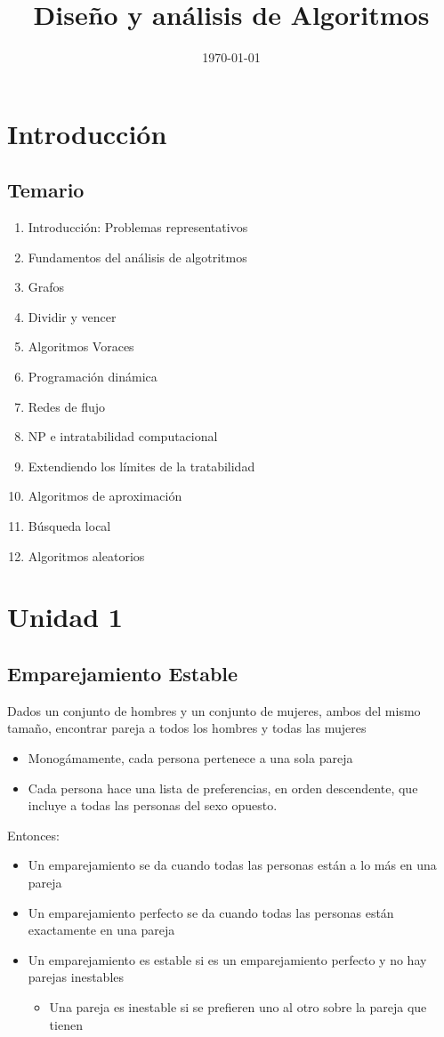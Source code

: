 \documentclass[letterpaper, 12pt]{article}
\date{\today}
\title{Diseño y análisis de Algoritmos}
\begin{document}
\section{Introducción}
\label{sec:orgc085671}
\subsection{Temario}
\label{sec:orgbb0116a}
\begin{enumerate}
\item Introducción: Problemas representativos
\item Fundamentos del análisis de algotritmos
\item Grafos
\item Dividir y vencer
\item Algoritmos Voraces
\item Programación dinámica
\item Redes de flujo
\item NP e intratabilidad computacional
\item Extendiendo los límites de la tratabilidad
\item Algoritmos de aproximación
\item Búsqueda local
\item Algoritmos aleatorios
\end{enumerate}
\section{Unidad 1}
\label{sec:org3651ec9}
\subsection{Emparejamiento Estable}
\label{sec:org469d506}
Dados un conjunto de hombres y un conjunto de mujeres, ambos del mismo tamaño,
encontrar pareja a todos los hombres y todas las mujeres
\begin{itemize}
\item Monogámamente, cada persona pertenece a una sola pareja
\item Cada persona hace una lista de preferencias, en orden descendente, que incluye
a todas las personas del sexo opuesto.
\end{itemize}

Entonces:
\begin{itemize}
\item Un emparejamiento se da cuando todas las personas están a lo más en una pareja
\item Un emparejamiento perfecto se da cuando todas las personas están exactamente
en una pareja
\item Un emparejamiento es estable si es un emparejamiento perfecto y no hay
parejas inestables
\begin{itemize}
\item Una pareja es inestable si se prefieren uno al otro sobre la pareja que
tienen
\end{itemize}
\end{itemize}
\end{document}
